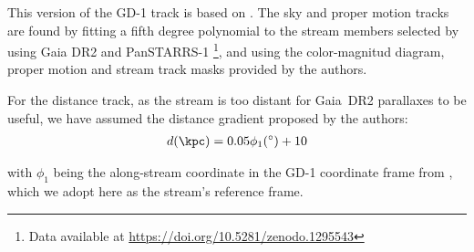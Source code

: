 This version of the GD-1 track is based on \citet{PriceWhelanBonaca2018_gd1}. The sky and proper motion tracks are found by fitting a fifth degree polynomial to the stream members selected by \citet{PriceWhelanBonaca2018_gd1} using Gaia DR2 and PanSTARRS-1 \footnote{Data available at \url{https://doi.org/10.5281/zenodo.1295543}}, and using the color-magnitud diagram, proper motion and stream track masks provided by the authors.

For the distance track, as the stream is too distant for Gaia~DR2 parallaxes to be useful, we have assumed the distance gradient proposed by the authors:
\begin{eqnarray*}
d (\kpc) = 0.05\phi_1(^\circ) +10
\end{eqnarray*}

with $\phi_1$ being the along-stream coordinate in the GD-1 coordinate frame from \citet{Koposov2010}, which we adopt here
as the stream's reference frame.


